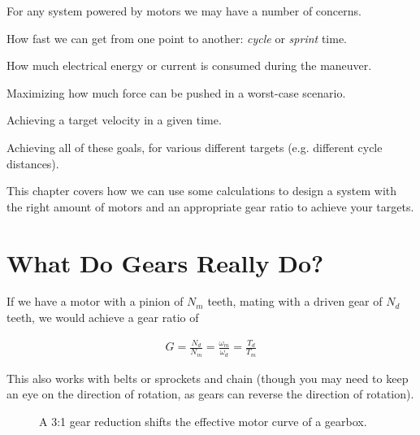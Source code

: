For any system powered by motors we may have a number of concerns.
\begin{asparaenum}[a)]
	\item How fast we can get from one point to another: \textit{cycle} or \textit{sprint} time.
	\item How much electrical energy or current is consumed during the maneuver.
	\item Maximizing how much force can be pushed in a worst-case scenario.
	\item Achieving a target velocity in a given time.
	\item Achieving all of these goals, for various different targets (e.g. different cycle distances).
\end{asparaenum}

This chapter covers how we can use some calculations to design a system with the right amount of motors and an appropriate gear ratio to achieve your targets.

\section{What Do Gears Really Do?}

If we have a motor with a pinion of $N_m$ teeth, mating with a driven gear of $N_d$ teeth, we would achieve a gear ratio of

\begin{align}
  G = \frac{N_d}{N_m} = \frac{\omega_m}{\omega_d} = \frac{T_d}{T_m}
\end{align}

This also works with belts or sprockets and chain (though you may need to keep an eye on the direction of rotation, as gears can reverse the direction of rotation).


\begin{figure}[H] \centering
{}
\caption{A 3:1 gear reduction shifts the effective motor curve of a gearbox.}
\end{figure}

